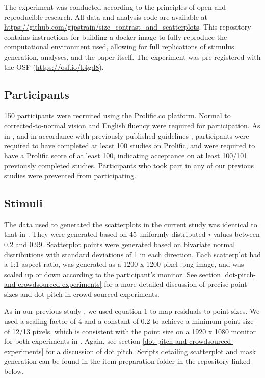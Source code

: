 \documentclass{vgtc}                          %
\begin{document}
The experiment was conducted according to the principles of open and reproducible research.
All data and analysis code are available at \url{https://github.com/gjpstrain/size_contrast_and_scatterplots}.
This repository contains instructions for building a docker image to fully
reproduce the computational environment used, allowing for full replications
of stimulus generation, analyses, and the paper itself. The experiment was
pre-registered with the OSF (\url{https://osf.io/k4gd8}).

\hypertarget{participants}{%
\subsection{Participants}\label{participants}}

150 participants were recruited using the Prolific.co platform. Normal to
corrected-to-normal vision and English fluency were required for participation. As in
\cite{strain_2023}, and in accordance with previously published guidelines \cite{peer_2021},
participants were required to have completed at least 100 studies on Prolific, and were
required to have a Prolific score of at least 100, indicating acceptance on at least
100/101 previously completed studies. Participants who took part in any of our
previous studies were prevented from participating.

\hypertarget{stimuli}{%
\subsection{Stimuli}\label{stimuli}}

The data used to generated the scatterplots in the current study was identical to that
in \cite{strain_2023}. They were generated based on 45 uniformly distributed \emph{r} values
between 0.2 and 0.99. Scatterplot points were generated based on bivariate normal
distributions with standard deviations of 1 in each direction. Each scatterplot
had a 1:1 aspect ratio, was generated as a 1200 x 1200 pixel .png image, and was
scaled up or down according to the participant's monitor. See section \ref{dot-pitch-and-crowdsourced-experiments}
for a more detailed discussion of precise point sizes and dot pitch in crowd-sourced
experiments.

As in our previous study \cite{strain_2023}, we used equation 1 to map residuals
to point sizes. We used a scaling factor of 4 and a constant of 0.2 to achieve a
minimum point size of 12/13 pixels, which is consistent with the point size on
a 1920 x 1080 monitor for both experiments in \cite{strain_2023}. Again, see section \ref{dot-pitch-and-crowdsourced-experiments}
for a discussion of dot pitch. Scripts detailing scatterplot and mask generation
can be found in the item preparation folder in the repository linked below.
\end{document}
